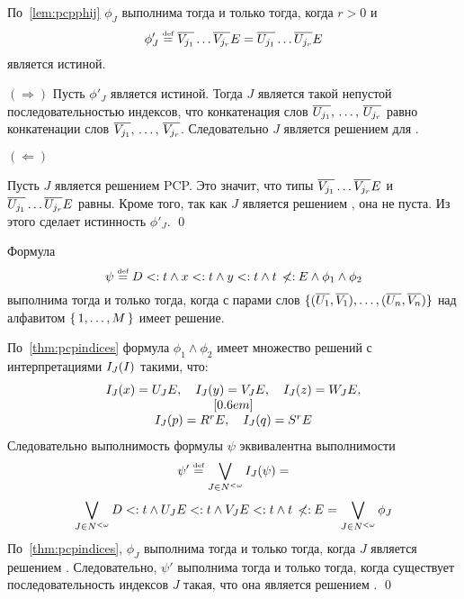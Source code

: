 \begin{proof*}
По~\autoref{lem:pcpphij} $\phi_{J}$ выполнима тогда и только тогда, когда $r>0$ и
\[
    \phi'_{J} \mathrel{\stackrel{\mbox{\normalfont\tiny def}}{=}} \overline{{V}_{j_1}}\ldots\overline{{V}_{j_r}}{E} = \overline{{U}_{j_1}}\ldots\overline{{U}_{j_r}}{E}
\] является истиной.

$(\Rightarrow)$
Пусть $\phi'_{J}$ является истиной. Тогда $J$ является такой непустой последовательностью индексов, что конкатенация слов $\overline{{U}_{j_1}}, \,\ldots,\,\overline{{U}_{j_r}}$ равно конкатенации слов $\overline{{V}_{j_1}}, \,\ldots,\,\overline{{V}_{j_r}}$. Следовательно $J$ является решением для \pcp.

$(\Leftarrow)$

Пусть $J$ является решением PCP. Это значит, что типы $\overline{{V}_{j_1}}\ldots\overline{{V}_{j_r}}{E}$ и $\overline{{U}_{j_1}}\ldots\overline{{U}_{j_r}}{E}$ равны. Кроме того, так как $J$ является решением \pcp, она не пуста. Из этого сделает истинность $\phi'_{J}$.
\qed\end{proof*}

\begin{thm}
Формула
\[
\psi \mathrel{\stackrel{\mbox{\normalfont\tiny def}}{=}} D <: t \land x <: t \land y <: t \land t \:\not\!\!{<:}\: {E} \land \phi_{1} \land \phi_{2}
\]
выполнима тогда и только тогда, когда \pcp{} с парами слов $\lbrace (\overline{{U}_{1}}, \overline{{V}_{1}}), \ldots , (\overline{{U}_{n}}, \overline{{V}_{n}})\rbrace$ над алфавитом $\lbrace \, {1}{},\ldots,{M}{} \, \rbrace$ имеет решение.
\end{thm}
\begin{proof*}
По~\autoref{thm:pcpindices} формула $\phi_{1} \land \phi_{2}$ имеет множество решений с интерпретациями $I_{J}(I)$ такими, что:
\[
    \begin{array}{c}
        I_{J}(x) = {U}_{J}{E}, \quad I_{J}(y) = {V}_{J}{E}, \quad I_{J}(z) = {W}_{J}{E}, \\
        [0.6em] \\
        I_{J}(p) = {R}^{r}{E}, \quad I_{J}(q) = {S}^{r}{E}
        
    \end{array}
\]
Следовательно выполнимость формулы $\psi$ эквивалентна выполнимости
\[
    \psi' \mathrel{\stackrel{\mbox{\normalfont\tiny def}}{=}} \bigvee_{J \in N^{<\omega}} I_{J}(\psi) =
\]
\[
    \bigvee_{J \in N^{<\omega}} D <: t \land {U}_{J}{E} <: t \land {V}_{J}{E} <: t \land t \:\not\!\!{<:}\: {E} =
    \bigvee_{J \in N^{<\omega}} \phi_{J}
\]
По~\autoref{thm:pcpindices}, $\phi_{J}$ выполнима тогда и только тогда, когда $J$ является решением \pcp. Следовательно, $\psi'$ выполнима тогда и только тогда, когда существует последовательность индексов $J$ такая, что она является решением \pcp.
\qed\end{proof*}

